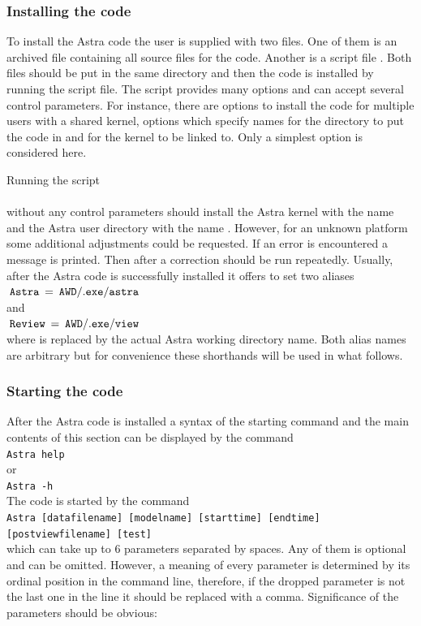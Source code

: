 \subsubsection{Installing the code}

To install the Astra code the user is supplied with two files. 
One of them is an archived file containing all source files for the code.
Another is a script file . 
Both files should be put in the same directory and then the code is
installed by running the script file. 
The script provides many options and can accept several control
parameters. 
For instance, there are options to install the code for multiple users
with a shared kernel, options which specify names for the
directory to put the code in and for the kernel to be linked to. 
Only a simplest option is considered here.

Running the script
\\ \indent{}\\
without any control parameters should install the Astra kernel with the
name  and the Astra user directory with the name
. 
However, for an unknown platform some additional adjustments could be
requested. 
If an error is encountered a message is printed.
Then after a correction  should be run repeatedly.
Usually, after the Astra code is successfully installed it offers to set
two aliases 
\\ \indent
$\hspace*{2pt}{\tt Astra}\hspace*{2pt}=\hspace*{2pt}{\tt AWD/.exe/astra}\hspace*{2pt}$
\\
and
\\ \indent
$\hspace*{2pt}{\tt Review}\hspace*{2pt}=\hspace*{2pt}{\tt AWD/.exe/view}\hspace*{2pt}$
\\
where  is replaced by the actual Astra working directory
name. 
Both alias names are arbitrary but for convenience these
shorthands will be used in what follows. 

\subsubsection{Starting the code}

After the Astra code is installed a syntax of the starting command and
the main contents of this section can be displayed by the command 
\\{\indent
\tt Astra help
}
\\
or
\\{\indent
\tt Astra -h
}
\\
The code is started by the command
\\{\indent
\tt Astra~[data\us file\us name]~[model\us name]~[start\us time]
[end\us time]\\
\hspace*{4.9em}
[post\us view\us file\us name]~[test]
}\\
which can take up to 6 parameters separated by spaces.
Any of them is optional and can be omitted. 
However, a meaning of every parameter is determined by its ordinal
position in the command line, therefore, if the dropped parameter is not
the last one in the line it should be replaced with a comma. 
Significance of the parameters should be obvious:

